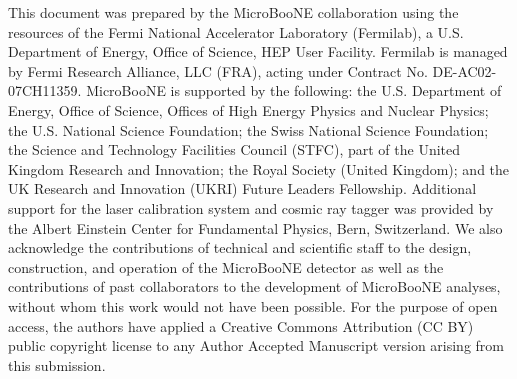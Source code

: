 \documentclass[reprint,
 amsmath,amssymb,
 aps,prd,
 superscriptaddress,
 twocolumn, longbibliography
]{revtex4-1}
\begin{document}
This document was prepared by the MicroBooNE collaboration using the resources of the Fermi National Accelerator Laboratory (Fermilab), a U.S. Department of Energy, Office of Science, HEP User Facility. Fermilab is managed by Fermi Research Alliance, LLC (FRA), acting under Contract No. DE-AC02-07CH11359.  MicroBooNE is supported by the following: the U.S. Department of Energy, Office of Science, Offices of High Energy Physics and Nuclear Physics; the U.S. National Science Foundation; the Swiss National Science Foundation; the Science and Technology Facilities Council (STFC), part of the United Kingdom Research and Innovation; the Royal Society (United Kingdom); and the UK Research and Innovation (UKRI) Future Leaders Fellowship. Additional support for the laser calibration system and cosmic ray tagger was provided by the Albert Einstein Center for Fundamental Physics, Bern, Switzerland. We also acknowledge the contributions of technical and scientific staff to the design, construction, and operation of the MicroBooNE detector as well as the contributions of past collaborators to the development of MicroBooNE analyses, without whom this work would not have been possible. For the purpose of open access, the authors have applied a Creative Commons Attribution (CC BY) public copyright license to any Author Accepted Manuscript version arising from this submission.



\clearpage
\end{document}
